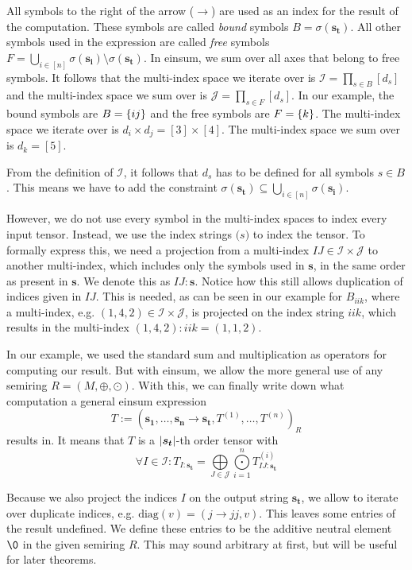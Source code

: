 \begin{definition}
    All symbols to the right of the arrow ($\rightarrow$) are used as an index for the result of the computation.
    These symbols are called \textit{bound} symbols $B = \sigma(\bm{s_t})$.
    All other symbols used in the expression are called \textit{free} symbols $F = \bigcup_{i \in [n]} \sigma(\bm{s_i}) \setminus \sigma(\bm{s_t})$.
    In einsum, we sum over all axes that belong to free symbols.
    It follows that the multi-index space we iterate over is $\mathcal{I} = \prod_{s \in B} [d_s]$ and the multi-index space we sum over is $\mathcal{J} = \prod_{s \in F} [d_s]$.
    In our example, the bound symbols are $B = \lbrace ij \rbrace$ and the free symbols are $F = \lbrace k \rbrace$.
    The multi-index space we iterate over is $d_i \times d_j = [3] \times [4]$.
    The multi-index space we sum over is $d_k = [5]$.

    From the definition of $\mathcal{I}$, it follows that $d_s$ has to be defined for all symbols $s \in B$.
    This means we have to add the constraint $\sigma(\bm{s_t}) \subseteq \bigcup_{i \in [n]} \sigma(\bm{s_i})$.

    However, we do not use every symbol in the multi-index spaces to index every input tensor.
    Instead, we use the index strings $\bm(s)$ to index the tensor.
    To formally express this, we need a projection from a multi-index $IJ \in \mathcal{I} \times \mathcal{J}$ to another multi-index, which includes only the symbols used in $\bm{s}$,
    in the same order as present in $\bm{s}$.
    We denote this as $IJ:\bm{s}$.
    Notice how this still allows duplication of indices given in $IJ$.
    This is needed, as can be seen in our example for $B_{iik}$,
    where a multi-index, e.g. $(1,4,2) \in \mathcal{I} \times \mathcal{J}$, is projected on the index string $iik$,
    which results in the multi-index $(1,4,2):iik = (1,1,2)$.

    In our example, we used the standard sum and multiplication as operators for computing our result.
    But with einsum, we allow the more general use of any semiring $R = (M, \oplus, \odot)$.
    With this, we can finally write down what computation a general einsum expression
    $$T := (\bm{s_1},\dots,\bm{s_n} \rightarrow \bm{s_t}, T^{(1)},\dots,T^{(n)})_R$$
    results in. It means that $T$ is a $\left| \bm{s_t} \right|$-th order tensor with
    $$\forall I \in \mathcal{I}: T_{I: \bm{s_t}} = \bigoplus\limits_{J \in \mathcal{J}} \bigodot\limits_{i = 1}^{n} T^{(i)}_{IJ:\bm{s_t}}$$

    Because we also project the indices $I$ on the output string $\bm{s_t}$, we allow to iterate over duplicate indices,
    e.g. $\text{diag}(v) = (j \rightarrow jj, v)$.
    This leaves some entries of the result undefined.
    We define these entries to be the additive neutral element $\0$ in the given semiring $R$.
    This may sound arbitrary at first, but will be useful for later theorems.


\end{definition}
